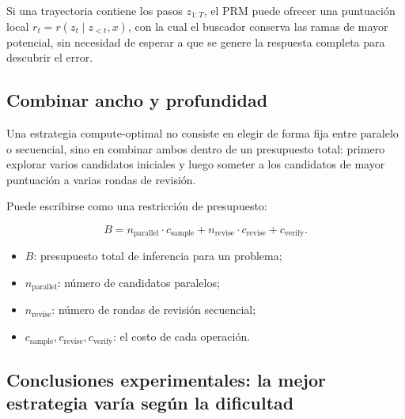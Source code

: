 Si una trayectoria contiene los pasos $z_{1:T}$, el PRM puede ofrecer una puntuación local $r_t=r(z_t\mid z_{<t},x)$, con la cual el buscador conserva las ramas de mayor potencial, sin necesidad de esperar a que se genere la respuesta completa para descubrir el error.

\subsection{Combinar ancho y profundidad}

Una estrategia compute-optimal no consiste en elegir de forma fija entre paralelo o secuencial, sino en combinar ambos dentro de un presupuesto total: primero explorar varios candidatos iniciales y luego someter a los candidatos de mayor puntuación a varias rondas de revisión.


Puede escribirse como una restricción de presupuesto:

$$
B=n_{\mathrm{parallel}}\cdot c_{\mathrm{sample}}
+n_{\mathrm{revise}}\cdot c_{\mathrm{revise}}
+c_{\mathrm{verify}}.
$$

\begin{itemize}
    \item $B$: presupuesto total de inferencia para un problema;
    \item $n_{\mathrm{parallel}}$: número de candidatos paralelos;
    \item $n_{\mathrm{revise}}$: número de rondas de revisión secuencial;
    \item $c_{\mathrm{sample}},c_{\mathrm{revise}},c_{\mathrm{verify}}$: el costo de cada operación.
\end{itemize}

\subsection{Conclusiones experimentales: la mejor estrategia varía según la dificultad}



